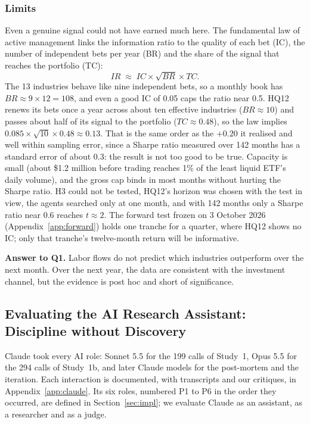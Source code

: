 \documentclass[11pt,letterpaper]{article}
\begin{document}
\subsubsection{Limits}
Even a genuine signal could not have earned much here. The fundamental law of
active management \citep{grinold1989,clarke2002} links the information ratio
to the quality of each bet (IC), the number of independent bets per year (BR)
and the share of the signal that reaches the portfolio (TC):
\begin{equation}\label{eq:flaw}
IR \;\approx\; IC \times \sqrt{BR} \times TC .
\end{equation}
The 13 industries behave like nine independent bets, so a monthly book has
$BR\approx 9\times12=108$, and even a good IC of 0.05 caps the ratio near 0.5.
HQ12 renews its bets once a year across about ten effective industries
($BR\approx10$) and passes about half of its signal to the portfolio
($TC\approx0.48$), so the law implies $0.085\times\sqrt{10}\times0.48\approx0.13$.
That is the same order as the $+0.20$ it realised and well within sampling
error, since a Sharpe ratio measured over 142 months has a standard error of
about 0.3: the result is not too good to be true. Capacity is small (about \$1.2 million before trading reaches
1\% of the least liquid ETF's daily volume), and the gross cap binds in most
months without hurting the Sharpe ratio. H3 could not be tested,
HQ12's horizon was chosen with the test in view, the agents searched only at one
month, and with 142 months only a Sharpe ratio near 0.6 reaches $t\approx2$. The
forward test frozen on 3 October 2026 (Appendix~\ref{app:forward}) holds one
tranche for a quarter, where HQ12 shows no IC; only that tranche's twelve-month
return will be informative.

\textbf{Answer to Q1.} Labor flows do not predict which industries outperform over the next
month. Over the next year, the data are consistent with the investment channel,
but the evidence is post hoc and short of significance.

\subsection{Evaluating the AI Research Assistant: Discipline without Discovery}\label{sec:ai}
Claude took every AI role: Sonnet 5.5 for the 199 calls of Study~1, Opus 5.5 for
the 294 calls of Study~1b, and later Claude models for the post-mortem and the
iteration. Each interaction is documented, with transcripts and our
critiques, in Appendix~\ref{app:claude}. Its six roles, numbered P1 to P6 in the order they occurred, are defined in
Section~\ref{sec:impl}; we evaluate Claude as an assistant, as a researcher and
as a judge.
\end{document}
